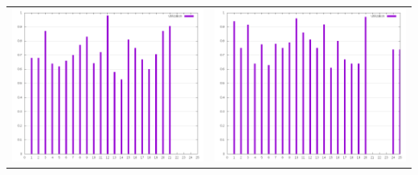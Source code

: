 \documentclass[a4paper, 11pt]{article}
\begin{document}
\begin{table}[!htb]
  \centering
  \begin{tabular}{cc}
  \includegraphics[scale=0.2]{cp1479681211168_5} & \includegraphics[scale=0.2]{cp1479681211168_10} \\

\end{tabular}
\end{table}
\end{document}
